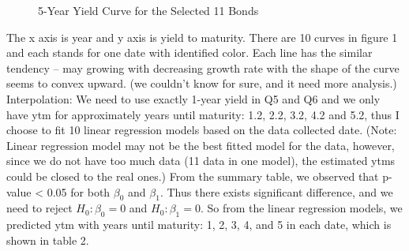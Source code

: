 \documentclass[10pt]{article}
\begin{document}
\begin{enumerate}
\begin{enumerate}
\begin{figure}[H]
                \caption{5-Year Yield Curve for the Selected 11 Bonds}
            \end{figure}
            The x axis is year and y axis is yield to maturity. There are 10 curves in figure 1 and each stands for one date with identified color. Each line has the similar tendency -- may growing with decreasing growth rate with the shape of the curve seems to convex upward. (we couldn't know for sure, and it need more analysis.)\\
            Interpolation: We need to use exactly 1-year yield in Q5 and Q6 and we only have ytm for approximately years until maturity: 1.2, 2.2, 3.2, 4.2 and 5.2, thus I choose to fit 10 linear regression models based on the data collected date. (Note: Linear regression model may not be the best fitted model for the data, however, since we do not have too much data (11 data in one model), the estimated ytms could be closed to the real ones.) From the summary table, we observed that p-value < 0.05 for both $\beta_0$ and $\beta_1$. Thus there exists significant difference, and we need to reject $H_0: \beta_0 = 0$ and  $H_0: \beta_1 = 0$. So from the linear regression models, we predicted ytm with years until maturity: 1, 2, 3, 4, and 5 in each date, which is shown in table 2.
            \begin{table}[H]
                \caption{Bonds’ Yield (YTM) with Maturity 1-5}
\end{table}
\end{enumerate}
\end{enumerate}
\end{document}
